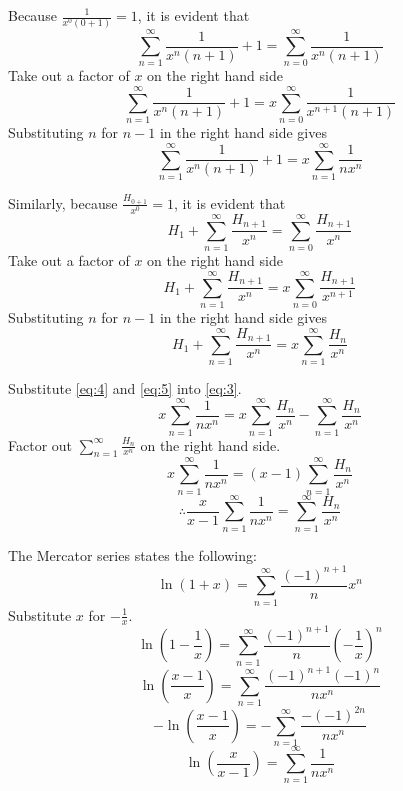 \documentclass[11pt]{article}
\begin{document}
 \vspace{1cm}
 
  Because $\displaystyle\frac{1}{x^0\left(0+1\right)}=1$, it is evident that 
  $$\sum_{n=1}^{\infty}{\frac{1}{x^n\left(n+1\right)}}+1=\sum_{n=0}^{\infty}{\frac{1}{x^n\left(n+1\right)}}$$
  Take out a factor of $x$ on the right hand side
    $$\sum_{n=1}^{\infty}{\frac{1}{x^n\left(n+1\right)}}+1=x\sum_{n=0}^{\infty}{\frac{1}{x^{n+1}\left(n+1\right)}}$$
Substituting $n$ for $n-1$ in the right hand side gives
\begin{equation} \label{eq:4}
    \sum_{n=1}^{\infty}{\frac{1}{x^n\left(n+1\right)}}+1=x\sum_{n=1}^{\infty}{\frac{1}{nx^{n}}}
  \end{equation}

  \vspace{1cm}

  Similarly, because $\displaystyle\frac{H_{0+1}}{x^0}=1$, it is evident that
  $$H_1+ \sum_{n=1}^{\infty}{\frac{H_{n+1}}{x^n}}=\sum_{n=0}^{\infty}{\frac{H_{n+1}}{x^n}}$$
  Take out a factor of $x$ on the right hand side
  $$H_1+ \sum_{n=1}^{\infty}{\frac{H_{n+1}}{x^n}}=x\sum_{n=0}^{\infty}{\frac{H_{n+1}}{x^{n+1}}}$$
Substituting $n$ for $n-1$ in the right hand side gives
  \begin{equation} \label{eq:5}
  H_1+ \sum_{n=1}^{\infty}{\frac{H_{n+1}}{x^n}}=x\sum_{n=1}^{\infty}{\frac{H_{n}}{x^{n}}}
  \end{equation}
  

Substitute \eqref{eq:4} and \eqref{eq:5} into \eqref{eq:3}. 
$$x\sum_{n=1}^{\infty}{\frac{1}{nx^{n}}}=x\sum_{n=1}^{\infty}{\frac{H_{n}}{x^{n}}}-\sum_{n=1}^{\infty}{\frac{H_{n}}{x^n}}$$
Factor out $\displaystyle\sum_{n=1}^{\infty}{\frac{H_{n}}{x^n}}$ on the right hand side.
$$x\sum_{n=1}^{\infty}{\frac{1}{nx^{n}}}=\left(x-1\right)\sum_{n=1}^{\infty}{\frac{H_{n}}{x^n}}$$
\begin{equation} \label{eq:6}
\therefore \frac{x}{x-1}\sum_{n=1}^{\infty}{\frac{1}{nx^{n}}}=\sum_{n=1}^{\infty}{\frac{H_{n}}{x^n}}
\end{equation}

  \vspace{1cm}

The Mercator series states the following:
$$\ln{(1+x)}=\sum_{n=1}^{\infty}{\frac{\left(-1 \right)^{n+1}}{n}x^n}$$
Substitute $x$ for $\displaystyle-\frac{1}{x}$.
$$\ln{\left(1-\frac{1}{x} \right )}=\sum_{n=1}^{\infty}{\frac{\left(-1 \right)^{n+1}}{n}{\left(-\frac{1}{x} \right )}^n}$$
$$\ln{\left(\frac{x-1}{x} \right )}=\sum_{n=1}^{\infty}{\frac{\left(-1 \right)^{n+1}\left(-1 \right)^{n}}{nx^{n}}}$$
$$-\ln{\left(\frac{x-1}{x} \right )}=-\sum_{n=1}^{\infty}{\frac{-\left(-1 \right)^{2n}}{nx^{n}}}$$
\begin{equation} \label{eq:7}
\ln{\left(\frac{x}{x-1}\right)}=\sum_{n=1}^{\infty}{\frac{1}{nx^{n}}}
\end{equation}
    
\end{document}

